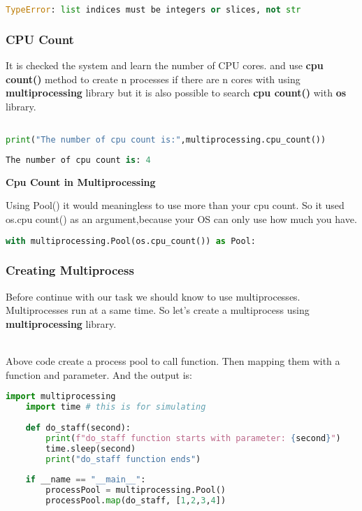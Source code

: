 \documentclass[onecolumn]{article}
\begin{document}
\begin{lstlisting}[language=Python, caption= An Error ]
TypeError: list indices must be integers or slices, not str
\end{lstlisting}

\subsubsection{CPU Count}

It is checked the system and learn the number of CPU cores. and use  \textbf{cpu count() } method to create n processes if there are n cores with using  \textbf{multiprocessing} library but it is also possible to search\textbf{ cpu count()} with \textbf{ os }library.

\begin{lstlisting}[language=Python, caption= CPU Count ]

print("The number of cpu count is:",multiprocessing.cpu_count())

\end{lstlisting}

\begin{lstlisting}[language=Python, caption=  Output ]
The number of cpu count is: 4
\end{lstlisting}

\textbf{Cpu Count in Multiprocessing}

 Using Pool() it would meaningless to use more than your cpu count.  So it used os.cpu count() as an argument,because your OS can only use how much you have. 

\begin{lstlisting}[language=Python, caption=  n process if there are n cores ]
with multiprocessing.Pool(os.cpu_count()) as Pool:
\end{lstlisting}

\subsubsection{Creating Multiprocess}
Before continue with our task we should know to use multiprocesses. Multiprocesses run at a same time. So let's create a multiprocess using \textbf{multiprocessing} library.

\\Above code create a process pool to call function. Then mapping them with a function and parameter. And the output is:\\

\begin{lstlisting}[language=Python, caption=How to create multiprocess example]
    import multiprocessing
    import time # this is for simulating
    
    def do_staff(second):
        print(f"do_staff function starts with parameter: {second}")
        time.sleep(second)
        print("do_staff function ends")
        
    if __name == "__main__":
        processPool = multiprocessing.Pool()
        processPool.map(do_staff, [1,2,3,4])
\end{lstlisting}
\end{document}
